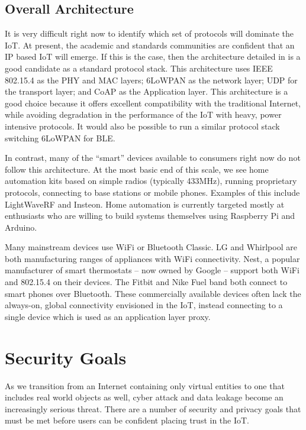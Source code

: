 \documentclass[10pt,journal,compsoc]{IEEEtran}
\begin{document}
\subsection{Overall Architecture}
It is very difficult right now to identify which set of protocols will dominate
the IoT. At present, the academic and standards communities are confident that
an IP based IoT will emerge. If this is the case, then the architecture
detailed in \cite{Palattella2013} is a good candidate as a standard protocol
stack. This architecture uses IEEE 802.15.4 as the PHY and MAC layers; 6LoWPAN
as the network layer; UDP for the transport layer; and CoAP as the Application
layer. This architecture is a good choice because it offers excellent
compatibility with the traditional Internet, while avoiding degradation in the
performance of the IoT with heavy, power intensive protocols. It would also be
possible to run a similar protocol stack switching 6LoWPAN for BLE. 

In contrast, many of the ``smart'' devices available to consumers right now do
not follow this architecture. At the most basic end of this scale, we see home
automation kits based on simple radios (typically 433MHz), running proprietary
protocols, connecting to base stations or mobile phones. Examples of this
include LightWaveRF and Insteon. Home automation is currently targeted mostly
at enthusiasts who are willing to build systems themselves using Raspberry Pi
and Arduino.  

Many mainstream devices use WiFi or Bluetooth Classic. LG and Whirlpool are
both manufacturing ranges of appliances with WiFi connectivity. Nest, a popular
manufacturer of smart thermostats -- now owned by Google -- support both WiFi
and 802.15.4 on their devices. The Fitbit and Nike Fuel band both connect to
smart phones over Bluetooth. These commercially available devices often lack
the always-on, global connectivity envisioned in the IoT, instead connecting
to a single device which is used as an application layer proxy.


\section{Security Goals}
As we transition from an Internet containing only virtual entities to one that
includes real world objects as well, cyber attack and data leakage become an
increasingly serious threat. There are a number of security and privacy goals that
must be met before users can be confident placing trust in the IoT.
\end{document}
